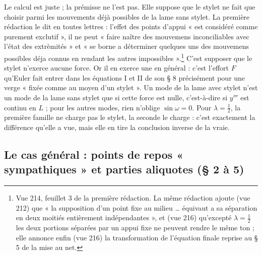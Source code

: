\documentclass[11pt,a4paper]{article}
\begin{document}
Le calcul est juste ; la prémisse ne l'est pas. Elle suppose que le stylet ne fait que choisir parmi les mouvements déjà possibles de la lame sans stylet. La première rédaction le dit en toutes lettres : l'effet des points d'appui « est considéré comme purement exclutif », il ne peut « faire naître des mouvemens inconciliables avec l'état des extrèmités » et « se borne a déterminer quelques uns des mouvemens possibles déja connus en rendant les autres impossibles ».\footnote{Vue 214, feuillet 3 de la première rédaction. La même rédaction ajoute (vue 212) que « la supposition d'un point fixe au milieu … équivaut a sa séparation en deux moitiés entièrement indépendantes », et (vue 216) qu'excepté $\lambda=\frac12$ les deux portions séparées par un appui fixe ne peuvent rendre le même ton ; elle annonce enfin (vue 216) la transformation de l'équation finale reprise au § 5 de la mise au net.} C'est supposer que le stylet n'exerce aucune force. Or il en exerce une en général : c'est l'effort $F$ qu'Euler fait entrer dans les équations I et II de son § 8 précisément pour une verge « fixée comme au moyen d'un stylet ». Un mode de la lame avec stylet n'est un mode de la lame sans stylet que si cette force est nulle, c'est-à-dire si $y'''$ est continu en $L$ ; pour les autres modes, rien n'oblige $\sin\omega=0$. Pour $\lambda=\frac12$, la première famille ne charge pas le stylet, la seconde le charge : c'est exactement la différence qu'elle a vue, mais elle en tire la conclusion inverse de la vraie.

\subsection*{Le cas général : points de repos « sympathiques » et parties aliquotes (§ 2 à 5)}
\end{document}
